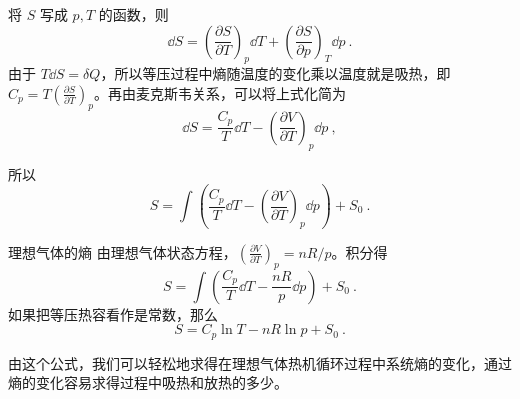 

将 $S$ 写成 $p,T$ 的函数，则
\begin{equation}
\dd S=\left(\frac{\partial S}{\partial T}\right)_p \dd T+\left(\frac{\partial S}{\partial p}\right)_T \dd p~.
\end{equation}
由于 $T\dd S=\delta Q$，所以等压过程中熵随温度的变化乘以温度就是吸热，即 $C_p=T\left(\frac{\partial S}{\partial T}\right)_p$。再由麦克斯韦关系，可以将上式化简为
\begin{equation}
\dd S=\frac{C_p}{T}\dd T-\left(\frac{\partial V}{\partial T}\right)_p\dd p~,
\end{equation}

所以
\begin{equation}\label{eq_MacroS_1}
S=\int \left(\frac{C_p}{T}\dd T-\left(\frac{\partial V}{\partial T}\right)_p\dd p\right)+S_0~.
\end{equation}

\begin{example}{理想气体的熵}
由理想气体状态方程，$\left(\frac{\partial V}{\partial T}\right)_p=nR/p$。积分得
\begin{equation}\label{eq_MacroS_2}
S=\int \left(\frac{C_p}{T}\dd T-\frac{nR}{p}\dd p\right)+S_0~.
\end{equation}
如果把等压热容看作是常数，那么
\begin{equation}
S=C_p\ln T-nR\ln p+S_0~.
\end{equation}

由这个公式，我们可以轻松地求得在理想气体热机循环过程中系统熵的变化，通过熵的变化容易求得过程中吸热和放热的多少。
\end{example}
